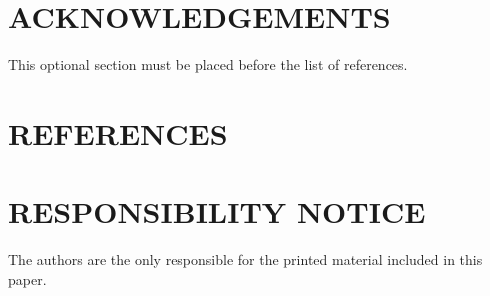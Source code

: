 \documentclass[10pt,fleqn,a4paper,twoside]{article}
\begin{document}
\section{ACKNOWLEDGEMENTS}

This optional section must be placed before the list of references.

\section{REFERENCES} 


\renewcommand{\refname}{}


\section{RESPONSIBILITY NOTICE}

The authors are the only responsible for the printed material included in this paper.
\end{document}
